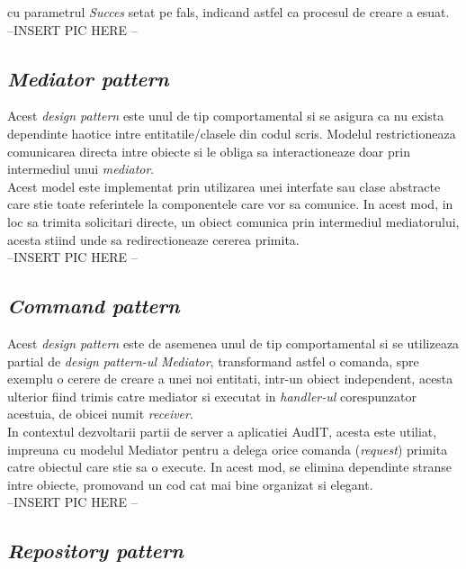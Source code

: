  cu parametrul \textit{Succes} setat pe fals, indicand astfel ca procesul de creare a esuat.\\

--INSERT PIC HERE --\\

\subsection*{\textit{Mediator pattern}}
Acest \textit{design pattern} este unul de tip comportamental si se asigura ca nu exista dependinte haotice intre entitatile/clasele din codul scris. Modelul restrictioneaza comunicarea directa intre obiecte si le obliga sa interactioneaze doar prin intermediul unui \textit{mediator}.\\
Acest model este implementat prin utilizarea unei interfate sau clase abstracte care stie toate referintele la componentele care vor sa comunice. In acest mod, in loc sa trimita solicitari directe, un obiect comunica prin intermediul mediatorului, acesta stiind unde sa redirectioneaze cererea primita.\\


--INSERT PIC HERE --

	
\subsection*{\textit{Command pattern}}	
Acest \textit{design pattern} este de asemenea unul de tip comportamental si se utilizeaza partial de \textit{design pattern-ul Mediator}, transformand astfel o comanda, spre exemplu o cerere de creare a unei noi entitati, intr-un obiect independent, acesta ulterior fiind trimis catre mediator si executat in \textit{handler-ul} corespunzator acestuia, de obicei numit \textit{receiver}.\\
In contextul dezvoltarii partii de server a aplicatiei AudIT, acesta este utiliat, impreuna cu modelul Mediator pentru a delega orice comanda (\textit{request}) primita catre obiectul care stie sa o execute. In acest mod, se elimina dependinte stranse intre obiecte, promovand un cod cat mai bine organizat si elegant.\\

--INSERT PIC HERE -- \\


\subsection*{\textit{Repository pattern}}

